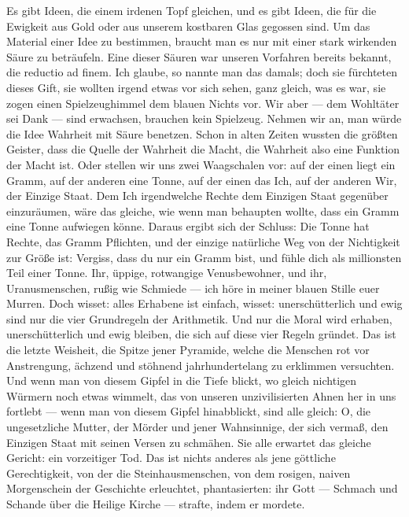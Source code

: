 Es gibt Ideen, die einem irdenen Topf gleichen, und es gibt Ideen,
die für die Ewigkeit aus Gold oder aus unserem kostbaren Glas
gegossen sind. Um das Material einer Idee zu bestimmen, braucht man
es nur mit einer stark wirkenden Säure zu beträufeln. Eine dieser
Säuren war unseren Vorfahren bereits bekannt, die reductio ad
finem. Ich glaube, so nannte man das damals; doch sie fürchteten
dieses Gift, sie wollten irgend etwas vor sich sehen, ganz gleich,
was es war, sie zogen einen Spielzeughimmel dem blauen Nichts vor.
Wir aber — dem Wohltäter sei Dank — sind erwachsen, brauchen kein
Spielzeug. Nehmen wir an, man würde die Idee Wahrheit mit Säure
benetzen. Schon in alten Zeiten wussten die größten Geister, dass
die Quelle der Wahrheit die Macht, die Wahrheit also eine Funktion
der Macht ist. Oder stellen wir uns zwei Waagschalen vor: auf der
einen liegt ein Gramm, auf der anderen eine Tonne, auf der einen
das Ich, auf der anderen Wir, der Einzige Staat. Dem Ich
irgendwelche Rechte dem Einzigen Staat gegenüber einzuräumen, wäre
das gleiche, wie wenn man behaupten wollte, dass ein Gramm eine
Tonne aufwiegen könne. Daraus ergibt sich der Schluss: Die Tonne
hat Rechte, das Gramm Pflichten, und der einzige natürliche Weg von
der Nichtigkeit zur Größe ist: Vergiss, dass du nur ein Gramm bist,
und fühle dich als millionsten Teil einer Tonne. Ihr, üppige,
rotwangige Venusbewohner, und ihr, Uranusmenschen, rußig wie
Schmiede — ich höre in meiner blauen Stille euer Murren. Doch
wisset: alles Erhabene ist einfach, wisset: unerschütterlich und
ewig sind nur die vier Grundregeln der Arithmetik. Und nur die
Moral wird erhaben, unerschütterlich und ewig bleiben, die sich auf
diese vier Regeln gründet. Das ist die letzte Weisheit, die Spitze
jener Pyramide, welche die
Menschen rot vor Anstrengung, ächzend und stöhnend jahrhundertelang
zu erklimmen versuchten. Und wenn man von diesem Gipfel in die
Tiefe blickt, wo gleich nichtigen Würmern noch etwas wimmelt, das
von unseren unzivilisierten Ahnen her in uns fortlebt — wenn man
von diesem Gipfel hinabblickt, sind alle gleich: O, die
ungesetzliche Mutter, der Mörder und jener Wahnsinnige, der sich
vermaß, den Einzigen Staat mit seinen Versen zu schmähen. Sie alle
erwartet das gleiche Gericht: ein vorzeitiger Tod. Das ist nichts
anderes als jene göttliche Gerechtigkeit, von der die
Steinhausmenschen, von dem rosigen, naiven Morgenschein der
Geschichte erleuchtet, phantasierten: ihr Gott — Schmach und
Schande über die Heilige Kirche — strafte, indem er mordete.

